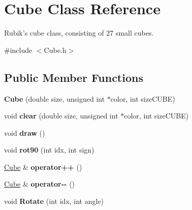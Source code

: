 \hypertarget{class_cube}{\section{Cube Class Reference}
\label{class_cube}
}


Rubik's cube class, consisting of 27 small cubes.  




{\ttfamily \#include $<$Cube.\-h$>$}

\subsection*{Public Member Functions}
\begin{DoxyCompactItemize}
\item 
\hypertarget{class_cube_a678a2a813ff5f9dc48505f5800d7b258}{{\bfseries Cube} (double size, unsigned int $\ast$color, int size\-C\-U\-B\-E)}\label{class_cube_a678a2a813ff5f9dc48505f5800d7b258}

\item 
\hypertarget{class_cube_a949110015d44b525523ab032b500dbb6}{void {\bfseries clear} (double size, unsigned int $\ast$color, int size\-C\-U\-B\-E)}\label{class_cube_a949110015d44b525523ab032b500dbb6}

\item 
\hypertarget{class_cube_ab26b72a81376fd5dc4fcc7f0b715b087}{void {\bfseries draw} ()}\label{class_cube_ab26b72a81376fd5dc4fcc7f0b715b087}

\item 
\hypertarget{class_cube_a37421bf387adc287bb226fb3ed33a667}{void {\bfseries rot90} (int idx, int sign)}\label{class_cube_a37421bf387adc287bb226fb3ed33a667}

\item 
\hypertarget{class_cube_aa8390380614128c05db3f64dc90521c8}{\hyperlink{class_cube}{Cube} \& {\bfseries operator++} ()}\label{class_cube_aa8390380614128c05db3f64dc90521c8}

\item 
\hypertarget{class_cube_a211cb778ec16c4e8fba79e42bf196424}{\hyperlink{class_cube}{Cube} \& {\bfseries operator-\/-\/} ()}\label{class_cube_a211cb778ec16c4e8fba79e42bf196424}

\item 
\hypertarget{class_cube_a8ecf673b0af2ed0666a5e0e21f8b853d}{void {\bfseries Rotate} (int idx, int angle)}\label{class_cube_a8ecf673b0af2ed0666a5e0e21f8b853d}

\end{DoxyCompactItemize}
